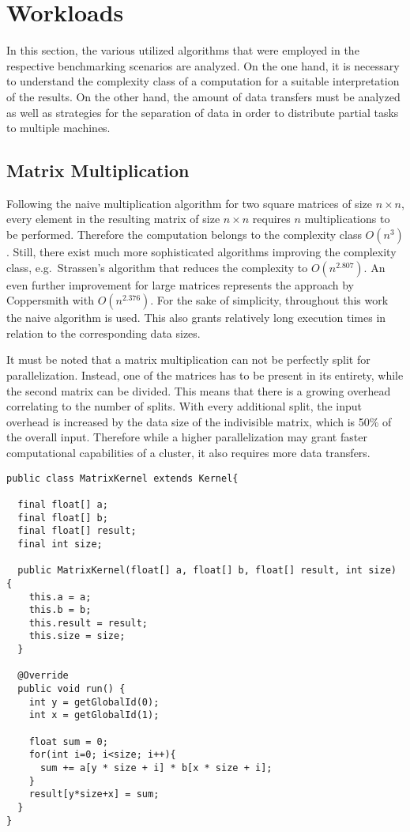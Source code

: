 \section{Workloads}
\label{workload_explanation}
In this section, the various utilized algorithms that were employed in the respective benchmarking scenarios are analyzed. On the one hand, it is necessary to understand the complexity class of a computation for a suitable interpretation of the results. On the other hand, the amount of data transfers must be analyzed as well as strategies for the separation of data in order to distribute partial tasks to multiple machines.

\subsection*{Matrix Multiplication}
\label{matrix_multiplication_workload}
Following the naive multiplication algorithm for two square matrices of size $n\times n$, every element in the resulting matrix of size $n\times n$ requires $n$ multiplications to be performed. Therefore the computation belongs to the complexity class $O(n^3)$. Still, there exist much more sophisticated algorithms improving the complexity class, e.g.~Strassen's algorithm that reduces the complexity to $O(n^{2.807})$\cite{strassen}. An even further improvement for large matrices represents the approach by Coppersmith with $O(n^{2.376})$\cite{coppersmith}. For the sake of simplicity, throughout this work the naive algorithm is used. This also grants relatively long execution times in relation to the corresponding data sizes.

It must be noted that a matrix multiplication can not be perfectly split for parallelization. Instead, one of the matrices has to be present in its entirety, while the second matrix can be divided. This means that there is a growing overhead correlating to the number of splits. With every additional split, the input overhead is increased by the data size of the indivisible matrix, which is 50\% of the overall input. Therefore while a higher parallelization may grant faster computational capabilities of a cluster, it also requires more data transfers.

\begin{lstlisting}[caption=Aparapi Matrix Multiplication,captionpos=b,label=lst:aparapi_matrix_multiplication]
public class MatrixKernel extends Kernel{

  final float[] a;
  final float[] b;
  final float[] result;
  final int size;

  public MatrixKernel(float[] a, float[] b, float[] result, int size) {
    this.a = a;
    this.b = b;
    this.result = result;
    this.size = size;
  }

  @Override
  public void run() {
    int y = getGlobalId(0);
    int x = getGlobalId(1);

    float sum = 0;
    for(int i=0; i<size; i++){
      sum += a[y * size + i] * b[x * size + i];
    }
    result[y*size+x] = sum;
  }
}
\end{lstlisting}

